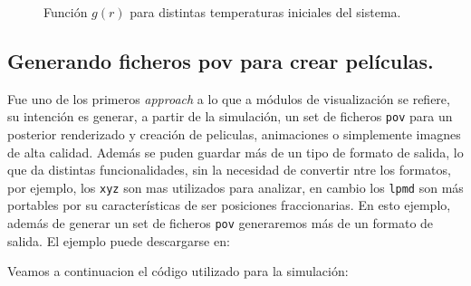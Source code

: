 \begin{figure}[!ht]
{ \label{fig:opogdr200}
}
\caption{Funci\'on $g(r)$ para distintas temperaturas iniciales del sistema.}
\label{fig:opogdr}
\end{figure}


\subsection{Generando ficheros pov para crear pel\'iculas.}

Fue uno de los primeros \textit{approach} a lo que a m\'odulos de visualizaci\'on se refiere, su intenci\'on es generar, a partir de la simulaci\'on, un set de ficheros \verb|pov| para un posterior renderizado y creaci\'on de peliculas, animaciones o simplemente imagnes de alta calidad. Adem\'as se puden guardar m\'as de un tipo de formato de salida, lo que da distintas funcionalidades, sin la necesidad de convertir ntre los formatos, por ejemplo, los \verb|xyz| son mas utilizados para analizar, en cambio los \verb|lpmd| son m\'as portables por su caracter\'isticas de ser posiciones fraccionarias. En esto ejemplo, adem\'as de generar un set de ficheros \verb|pov| generaremos m\'as de un formato de salida. El ejemplo puede descargarse en:


Veamos a continuacion el c\'odigo utilizado para la simulaci\'on:

